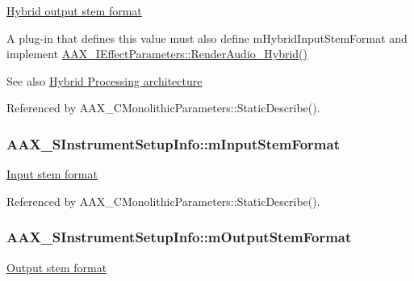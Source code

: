 \hyperlink{a00335_ga6571f4e41a5dd06e4067249228e2249eac30a4e73772e37267dfef39ae3122705}{Hybrid output stem format} 

A plug-\/in that defines this value must also define {\ttfamily m\+Hybrid\+Input\+Stem\+Format} and implement \hyperlink{a00335_gae6139041de22f51f3146d26a01c54c1b}{A\+A\+X\+\_\+\+I\+Effect\+Parameters\+::\+Render\+Audio\+\_\+\+Hybrid()} \begin{DoxySeeAlso}{See also}
\hyperlink{a00335}{Hybrid Processing architecture} 
\end{DoxySeeAlso}


Referenced by A\+A\+X\+\_\+\+C\+Monolithic\+Parameters\+::\+Static\+Describe().

\hypertarget{a00124_aeb7ea647e496b742bc5bad5576f5ec1f}{}
\subsubsection[{m\+Input\+Stem\+Format}]{ A\+A\+X\+\_\+\+S\+Instrument\+Setup\+Info\+::m\+Input\+Stem\+Format}\label{a00124_aeb7ea647e496b742bc5bad5576f5ec1f}


\hyperlink{a00283_a6571f4e41a5dd06e4067249228e2249eadebf03028b758123965a8b988fa2df99}{Input stem format} 



Referenced by A\+A\+X\+\_\+\+C\+Monolithic\+Parameters\+::\+Static\+Describe().

\hypertarget{a00124_ac69ab2fe88b00dfb6f22d7e2ebfa134d}{}
\subsubsection[{m\+Output\+Stem\+Format}]{ A\+A\+X\+\_\+\+S\+Instrument\+Setup\+Info\+::m\+Output\+Stem\+Format}\label{a00124_ac69ab2fe88b00dfb6f22d7e2ebfa134d}


\hyperlink{a00283_a6571f4e41a5dd06e4067249228e2249ea211fdc6277e7fa652b5d482e810b0bc9}{Output stem format} 



